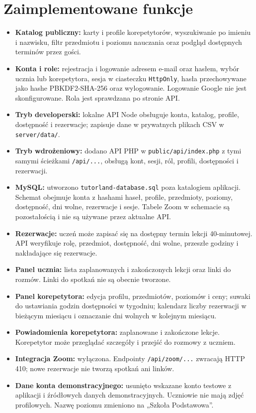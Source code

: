 \documentclass[10pt,a4paper]{article}
\begin{document}
\section{Zaimplementowane funkcje}
\begin{itemize}
\item \textbf{Katalog publiczny:} karty i profile korepetytorów, wyszukiwanie po imieniu i nazwisku, filtr przedmiotu i poziomu nauczania oraz podgląd dostępnych terminów przez gości.
\item \textbf{Konta i role:} rejestracja i logowanie adresem e-mail oraz hasłem, wybór ucznia lub korepetytora, sesja w ciasteczku \texttt{HttpOnly}, hasła przechowywane jako hashe PBKDF2-SHA-256 oraz wylogowanie. Logowanie Google nie jest skonfigurowane. Rola jest sprawdzana po stronie API.
\item \textbf{Tryb developerski:} lokalne API Node obsługuje konta, katalog, profile, dostępność i rezerwacje; zapisuje dane w prywatnych plikach CSV w \texttt{server/data/}.
\item \textbf{Tryb wdrożeniowy:} dodano API PHP w \texttt{public/api/index.php} z tymi samymi ścieżkami \texttt{/api/...}, obsługą kont, sesji, ról, profili, dostępności i rezerwacji.
\item \textbf{MySQL:} utworzono \texttt{tutorland-database.sql} poza katalogiem aplikacji. Schemat obejmuje konta z hashami haseł, profile, przedmioty, poziomy, dostępność, dni wolne, rezerwacje i sesje. Tabele Zoom w schemacie są pozostałością i nie są używane przez aktualne API.
\item \textbf{Rezerwacje:} uczeń może zapisać się na dostępny termin lekcji 40-minutowej. API weryfikuje rolę, przedmiot, dostępność, dni wolne, przeszłe godziny i nakładające się rezerwacje.
\item \textbf{Panel ucznia:} lista zaplanowanych i zakończonych lekcji oraz linki do rozmów. Linki do spotkań nie są obecnie tworzone.
\item \textbf{Panel korepetytora:} edycja profilu, przedmiotów, poziomów i ceny; suwaki do ustawiania godzin dostępności w tygodniu; kalendarz liczby rezerwacji w bieżącym miesiącu i oznaczanie dni wolnych w kolejnym miesiącu.
\item \textbf{Powiadomienia korepetytora:} zaplanowane i zakończone lekcje. Korepetytor może przeglądać szczegóły i przejść do rozmowy z uczniem.
\item \textbf{Integracja Zoom:} wyłączona. Endpointy \texttt{/api/zoom/...} zwracają HTTP 410; nowe rezerwacje nie tworzą spotkań ani linków.
\item \textbf{Dane konta demonstracyjnego:} usunięto wskazane konto testowe z aplikacji i źródłowych danych demonstracyjnych. Uczniowie nie mają zdjęć profilowych. Nazwę poziomu zmieniono na „Szkoła Podstawowa”.
\end{itemize}
\end{document}
